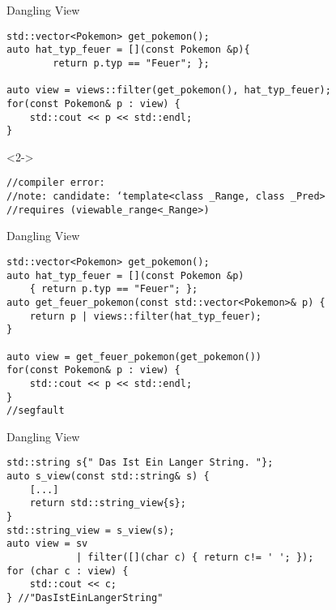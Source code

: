 

\begin{frame}[fragile]{Dangling View}
	\begin{overlayarea}{\linewidth}{5cm}
		\begin{verbatim}
std::vector<Pokemon> get_pokemon();
auto hat_typ_feuer = [](const Pokemon &p){ 
        return p.typ == "Feuer"; };

auto view = views::filter(get_pokemon(), hat_typ_feuer);
for(const Pokemon& p : view) {
    std::cout << p << std::endl;
}
    \end{verbatim}
		\begin{onlyenv}<2->
			\begin{verbatim}
//compiler error:
//note: candidate: ‘template<class _Range, class _Pred>
//requires (viewable_range<_Range>)
        \end{verbatim}
		\end{onlyenv}
	\end{overlayarea}

\end{frame}


\begin{frame}[fragile]{Dangling View}
	\begin{verbatim}
std::vector<Pokemon> get_pokemon();
auto hat_typ_feuer = [](const Pokemon &p)
    { return p.typ == "Feuer"; };
auto get_feuer_pokemon(const std::vector<Pokemon>& p) {
    return p | views::filter(hat_typ_feuer);
}

auto view = get_feuer_pokemon(get_pokemon())
for(const Pokemon& p : view) {
    std::cout << p << std::endl;
}
//segfault
    \end{verbatim}
\end{frame}


\begin{frame}[fragile]{Dangling View}
    \begin{verbatim}
std::string s{" Das Ist Ein Langer String. "};
auto s_view(const std::string& s) {
    [...]
    return std::string_view{s};
}
std::string_view = s_view(s);
auto view = sv
            | filter([](char c) { return c!= ' '; });
for (char c : view) {
    std::cout << c;
} //"DasIstEinLangerString"
    \end{verbatim}
\end{frame}

